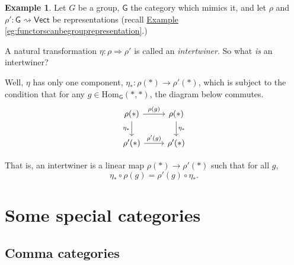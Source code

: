\documentclass[a4paper,10pt]{scrreprt}
\newcommand{\Hom}{\mathrm{Hom}}
\theoremstyle{definition}
\newtheorem{example}{Example}[section]
\theoremstyle{plain}
\theoremstyle{remark}
\begin{document}
\begin{example}
  \label{eg:intertwinersarenaturaltransformations}
  Let $G$ be a group, $\mathsf{G}$ the category which mimics it, and let $\rho$ and $\rho'\colon \mathsf{G} \rightsquigarrow \mathsf{Vect}$ be representations (recall \hyperref[eg:functorscanbegrouprepresentation]{Example \ref*{eg:functorscanbegrouprepresentation}}.)

  A natural transformation $\eta\colon \rho \Rightarrow \rho'$ is called an \emph{intertwiner}. So what \emph{is} an intertwiner?

  Well, $\eta$ has only one component, $\eta_{*}\colon \rho(*) \to \rho'(*)$, which is subject to the condition that for any $g \in \Hom_{\mathsf{G}}(*,*)$, the diagram below commutes.
  \begin{equation*}
    \begin{tikzcd}
      \rho(*)
      \arrow[r, "\rho(g)"]
      \arrow[d, swap, "\eta_{*}"]
      & \rho(*)
      \arrow[d, "\eta_{*}"]
      \\
      \rho'(*)
      \arrow[r, "\rho'(g)"]
      & \rho'(*)
    \end{tikzcd}
  \end{equation*}

  That is, an intertwiner is a linear map $\rho(*) \to \rho'(*)$ such that for all $g$,
  \begin{equation*}
    \eta_{*} \circ \rho(g) = \rho'(g) \circ \eta_{*}.
  \end{equation*}
\end{example}

\section{Some special categories} \label{sec:specialcategories}
\subsection{Comma categories}
\end{document}
